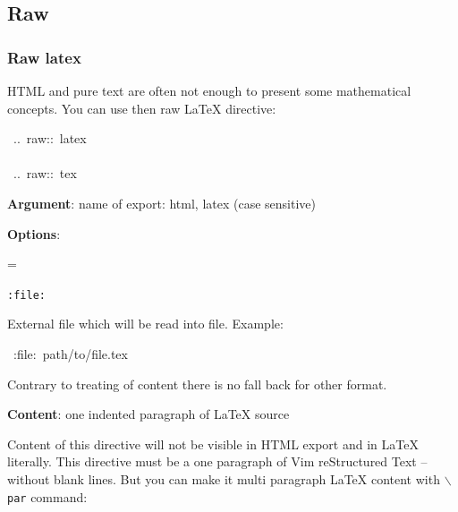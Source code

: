 \documentclass[12pt]{article}
\newenvironment{deflist}[1]{%
\begin{list}{}
{\renewcommand{\makelabel}[1]{\textbf{##1}\hfill}
\settowidth{\labelwidth}{\textbf{#1}}
\leftmargin=\labelwidth
\advance \leftmargin\labelsep}}
{\end{list}}
\begin{document}
\subsection{Raw}
\hypertarget{lraw-latex}{}
\subsubsection{Raw latex}

HTML and pure text are often not enough to present some mathematical
concepts. You can use then raw \LaTeX{} directive:

\begin{ttfamily}\begin{flushleft}
\mbox{~..~raw::~latex}\\
\mbox{}\\
\mbox{~..~raw::~tex}\\
\end{flushleft}\end{ttfamily}

\begin{itemize}
\item
\textbf{Argument}: name of export: html, latex (case sensitive)

\item
\textbf{Options}:

 \begin{deflist}{iii}

\item[ \texttt{:file:}]

External file which will be read into file. Example:

\begin{ttfamily}\begin{flushleft}
\mbox{~:file:~path/to/file.tex}\\
\end{flushleft}\end{ttfamily}

 Contrary to treating of content there is no fall back for other
 format.
\end{deflist}

\item
\textbf{Content}: one indented paragraph of \LaTeX{} source
\end{itemize}

Content of this directive will not be visible in HTML export and in \LaTeX{}
literally. This directive must be a one paragraph of Vim reStructured Text -- without blank
lines. But you can make it multi paragraph \LaTeX{} content with \texttt{$\backslash$par}
command:
\end{document}

